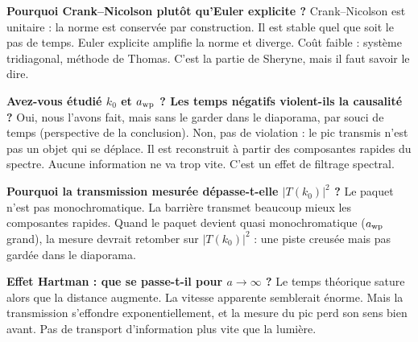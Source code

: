 \documentclass[12pt,a4paper]{article}
\begin{document}
\textbf{Pourquoi Crank--Nicolson plutôt qu'Euler explicite ?}
Crank--Nicolson est unitaire : la norme est conservée par construction.
Il est stable quel que soit le pas de temps.
Euler explicite amplifie la norme et diverge.
Coût faible : système tridiagonal, méthode de Thomas.
C'est la partie de Sheryne, mais il faut savoir le dire.

\textbf{Avez-vous étudié $k_0$ et $a_{\rm wp}$ ? Les temps négatifs
violent-ils la causalité ?}
Oui, nous l'avons fait, mais sans le garder dans le diaporama,
par souci de temps (perspective de la conclusion).
Non, pas de violation : le pic transmis n'est pas un objet qui se déplace.
Il est reconstruit à partir des composantes rapides du spectre.
Aucune information ne va trop vite.
C'est un effet de filtrage spectral.

\textbf{Pourquoi la transmission mesurée dépasse-t-elle $|T(k_0)|^2$ ?}
Le paquet n'est pas monochromatique.
La barrière transmet beaucoup mieux les composantes rapides.
Quand le paquet devient quasi monochromatique ($a_{\rm wp}$ grand),
la mesure devrait retomber sur $|T(k_0)|^2$ : une piste creusée
mais pas gardée dans le diaporama.

\textbf{Effet Hartman : que se passe-t-il pour $a \to \infty$ ?}
Le temps théorique sature alors que la distance augmente.
La vitesse apparente semblerait énorme.
Mais la transmission s'effondre exponentiellement,
et la mesure du pic perd son sens bien avant.
Pas de transport d'information plus vite que la lumière.
\end{document}
